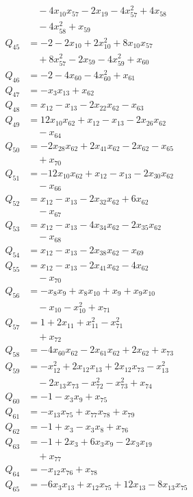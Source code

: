\begin{align*}
&\quad -4x_{10}x_{57}-2x_{19}-4x_{57}^{2}+4x_{58}\\
&\quad -4x_{58}^{2}+x_{59}\\
Q_{45}&=-2-2x_{10}+2x_{10}^{2}+8x_{10}x_{57}\\
&\quad +8x_{57}^{2}-2x_{59}-4x_{59}^{2}+x_{60}\\
Q_{46}&=-2-4x_{60}-4x_{60}^{2}+x_{61}\\
Q_{47}&=-x_{3}x_{13}+x_{62}\\
Q_{48}&=x_{12}-x_{13}-2x_{22}x_{62}-x_{63}\\
Q_{49}&=12x_{10}x_{62}+x_{12}-x_{13}-2x_{26}x_{62}\\
&\quad -x_{64}\\
Q_{50}&=-2x_{28}x_{62}+2x_{41}x_{62}-2x_{62}-x_{65}\\
&\quad +x_{70}\\
Q_{51}&=-12x_{10}x_{62}+x_{12}-x_{13}-2x_{30}x_{62}\\
&\quad -x_{66}\\
Q_{52}&=x_{12}-x_{13}-2x_{32}x_{62}+6x_{62}\\
&\quad -x_{67}\\
Q_{53}&=x_{12}-x_{13}-4x_{34}x_{62}-2x_{35}x_{62}\\
&\quad -x_{68}\\
Q_{54}&=x_{12}-x_{13}-2x_{38}x_{62}-x_{69}\\
Q_{55}&=x_{12}-x_{13}-2x_{41}x_{62}-4x_{62}\\
&\quad -x_{70}\\
Q_{56}&=-x_{8}x_{9}+x_{8}x_{10}+x_{9}+x_{9}x_{10}\\
&\quad -x_{10}-x_{10}^{2}+x_{71}\\
Q_{57}&=1+2x_{11}+x_{11}^{2}-x_{71}^{2}\\
&\quad +x_{72}\\
Q_{58}&=-4x_{60}x_{62}-2x_{61}x_{62}+2x_{62}+x_{73}\\
Q_{59}&=-x_{12}^{2}+2x_{12}x_{13}+2x_{12}x_{73}-x_{13}^{2}\\
&\quad -2x_{13}x_{73}-x_{72}^{2}-x_{73}^{2}+x_{74}\\
Q_{60}&=-1-x_{3}x_{9}+x_{75}\\
Q_{61}&=-x_{13}x_{75}+x_{77}x_{78}+x_{79}\\
Q_{62}&=-1+x_{3}-x_{3}x_{8}+x_{76}\\
Q_{63}&=-1+2x_{3}+6x_{3}x_{9}-2x_{3}x_{19}\\
&\quad +x_{77}\\
Q_{64}&=-x_{12}x_{76}+x_{78}\\
Q_{65}&=-6x_{3}x_{13}+x_{12}x_{75}+12x_{13}-8x_{13}x_{75}\\

\end{align*}
